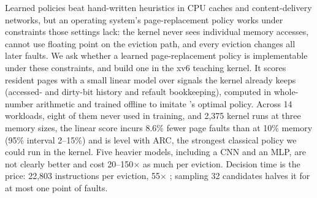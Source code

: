 %
Learned policies beat hand-written heuristics in CPU caches and content-delivery
networks, but an operating system's page-replacement policy works under constraints
those settings lack: the kernel never sees individual memory accesses, cannot use
floating point on the eviction path, and every eviction changes all later faults.
We ask whether a learned page-replacement policy is implementable under these
constraints, and build one in the xv6 teaching kernel. It scores resident pages with a
small linear model over signals the kernel already keeps (accessed- and dirty-bit
history and refault bookkeeping), computed in whole-number arithmetic and trained
offline to imitate \belady's optimal policy.
Across 14 workloads, eight of them never used in training, and 2,375 kernel runs at
three memory sizes, the linear score incurs 8.6\% fewer page faults than \clock at 10\%
memory (95\% interval 2--15\%) and is level with ARC, the strongest classical policy we
could run in the kernel. Five heavier models, including a CNN and an MLP, are not
clearly better and cost 20--150$\times$ as much per eviction.
Decision time is the price: 22,803 instructions per eviction, 55$\times$ \clock;
sampling 32 candidates halves it for at most one point of faults.
